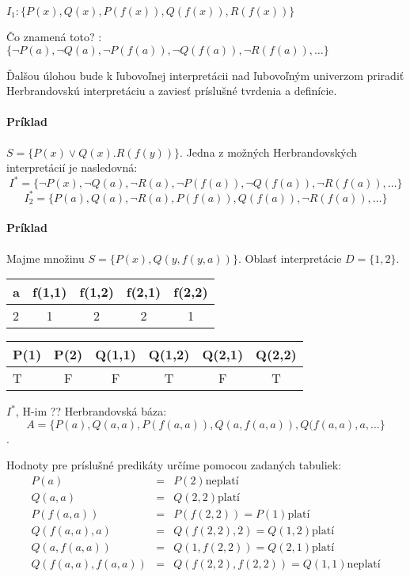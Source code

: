 $I_1: \{ P(x), Q(x), P(f(x)), Q(f(x)), R(f(x)) \}$

Čo znamená toto? :
$  \{ \neg P(a), \neg Q(a), \neg P(f(a)), \neg Q(f(a)), \neg R(f(a)), \ldots \}$


Ďalšou úlohou bude k ľubovoľnej interpretácii nad ľubovoľným univerzom
priradiť Herbrandovskú interpretáciu a zaviesť príslušné tvrdenia a definície.

\paragraph{Príklad} $S=\{ P(x) \lor Q(x). R(f(y)) \}$.  Jedna z možných
Herbrandovských interpretácií je nasledovná:
$$ I^* = \{ \neg P(x), \neg Q(a), \neg R(a), \neg P(f(a)), \neg Q(f(a)), \neg
R(f(a)), \ldots \}$$
$$ I_2^* = \{ P(a), Q(a), \neg R(a), P(f(a)), Q(f(a)), \neg R(f(a)), \ldots \}$$

\paragraph{Príklad} Majme množinu $S = \{ P(x), Q(y, f(y,a)) \}$. Oblasť
interpretácie $D = \{1,2\}$.

\begin{tabular}{|l|c|c|c|c|}
\hline
a & f(1,1) & f(1,2) & f(2,1) & f(2,2) \\
\hline
2 & 1 & 2 & 2 & 1 \\
\hline
\end{tabular}

\begin{tabular}{|l|c|c|c|c|c|}
\hline
P(1) & P(2) & Q(1,1) & Q(1,2) & Q(2,1) & Q(2,2) \\
\hline
T & F & F & T & F & T \\
\hline
\end{tabular}

$I^*$, H-im ??
Herbrandovská báza: $$A=\{ P(a), Q(a,a), P(f(a,a)), Q(a,f(a,a)), Q(f(a,a), a,
\ldots \}$$.

Hodnoty pre príslušné predikáty určíme pomocou zadaných tabuliek:
$$
\begin{array}{lll}
P(a) &=& P(2) \mbox{neplatí} \\
Q(a,a) &=& Q(2,2) \mbox{platí} \\
P(f(a,a)) &=& P(f(2,2)) = P(1) \mbox{platí} \\
Q(f(a,a),a) &=& Q(f(2,2),2) = Q(1,2) \mbox{platí} \\
Q(a,f(a,a)) &=& Q(1,f(2,2)) = Q(2,1) \mbox{platí} \\
Q(f(a,a),f(a,a)) &=& Q(f(2,2), f(2,2)) = Q(1,1) \mbox{neplatí} \\
\end{array}
$$

